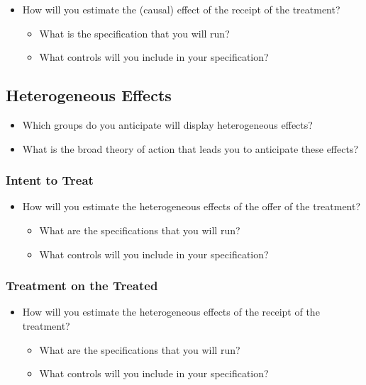 \documentclass[
  letterpaper,
  DIV=11,
  numbers=noendperiod]{scrartcl}
\providecommand{\tightlist}{%
  \setlength{\itemsep}{0pt}\setlength{\parskip}{0pt}}\usepackage{longtable,booktabs,array}
\begin{document}
\begin{itemize}
\tightlist
\item
  How will you estimate the (causal) effect of the receipt of the
  treatment?

  \begin{itemize}
  \tightlist
  \item
    What is the specification that you will run?
  \item
    What controls will you include in your specification?
  \end{itemize}
\end{itemize}

\subsection{Heterogeneous Effects}\label{heterogeneous-effects}

\begin{itemize}
\tightlist
\item
  Which groups do you anticipate will display heterogeneous effects?
\item
  What is the broad theory of action that leads you to anticipate these
  effects?
\end{itemize}

\subsubsection{Intent to Treat}\label{intent-to-treat-1}

\begin{itemize}
\tightlist
\item
  How will you estimate the heterogeneous effects of the offer of the
  treatment?

  \begin{itemize}
  \tightlist
  \item
    What are the specifications that you will run?
  \item
    What controls will you include in your specification?
  \end{itemize}
\end{itemize}

\subsubsection{Treatment on the
Treated}\label{treatment-on-the-treated-1}

\begin{itemize}
\tightlist
\item
  How will you estimate the heterogeneous effects of the receipt of the
  treatment?

  \begin{itemize}
  \tightlist
  \item
    What are the specifications that you will run?
  \item
    What controls will you include in your specification?
  \end{itemize}
\end{itemize}
\end{document}
